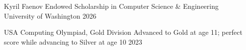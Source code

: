 
\begin{cvhonors}
  \cvhonor
    {Kyril Faenov Endowed Scholarship in Computer Science \& Engineering}
    {University of Washington}
    {}
    {2026}


  \cvhonor
    {USA Computing Olympiad, Gold Division}
    {Advanced to Gold at age 11; perfect score while advancing to Silver at age 10}
    {}
    {2023}

\end{cvhonors}

